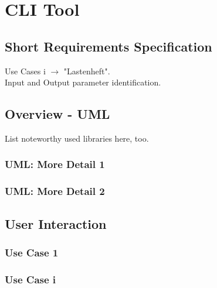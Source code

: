 
\section{CLI Tool}

\subsection{Short Requirements Specification}
Use Cases i $\longrightarrow$ "Lastenheft".\\
Input and Output parameter identification.

\subsection{Overview - UML}

List noteworthy used libraries here, too.

\subsubsection{UML: More Detail 1}
\subsubsection{UML: More Detail 2}

\subsection{User Interaction}
\subsubsection{Use Case 1}
\subsubsection{Use Case i}

\pagebreak